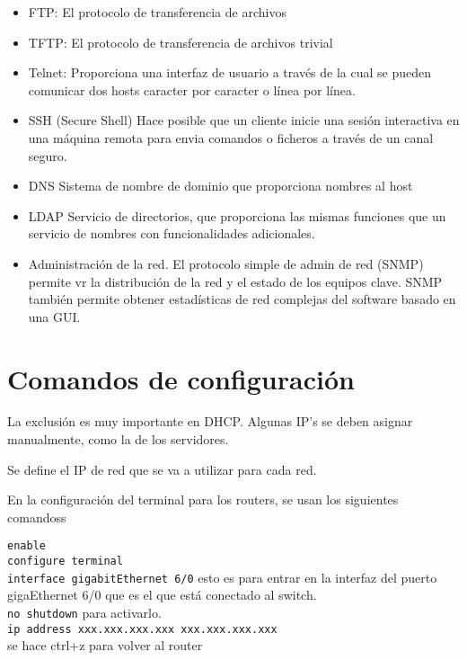 \begin{itemize}
    \item FTP: El protocolo de transferencia de archivos
    \item TFTP: El protocolo de transferencia de archivos trivial
    \item Telnet: Proporciona una interfaz de usuario a través de la cual se pueden comunicar dos hosts caracter por caracter o línea por línea.
    \item SSH (Secure Shell) Hace posible que un cliente inicie una sesión interactiva en una máquina remota para envia comandos o ficheros a través de un canal seguro.  
    \item DNS Sistema de nombre de dominio que proporciona nombres al host
    \item LDAP Servicio de directorios, que proporciona las mismas funciones que un servicio de nombres con funcionalidades adicionales.
    \item Administración de la red. El protocolo simple de admin de red (SNMP) permite vr la distribución de la red y el estado de los equipos clave. SNMP también permite obtener estadísticas de red complejas del software basado en una GUI.
\end{itemize}






\section{Comandos de configuración}

La exclusión es muy importante en DHCP. Algunas IP's se deben asignar manualmente, como la de los servidores. 


Se define el IP de red que se va a utilizar para cada red.
 
 
En la configuración del terminal para los routers, se usan los siguientes comandoss

\texttt{enable} \\
\texttt{configure terminal} \\
\texttt{interface gigabitEthernet 6/0} esto es para entrar en la interfaz del puerto gigaEthernet 6/0 que es el que está conectado al switch. \\
\texttt{no shutdown} para activarlo. \\
\texttt{ip address xxx.xxx.xxx.xxx xxx.xxx.xxx.xxx} \\

se hace ctrl+z para volver al router \\ 

